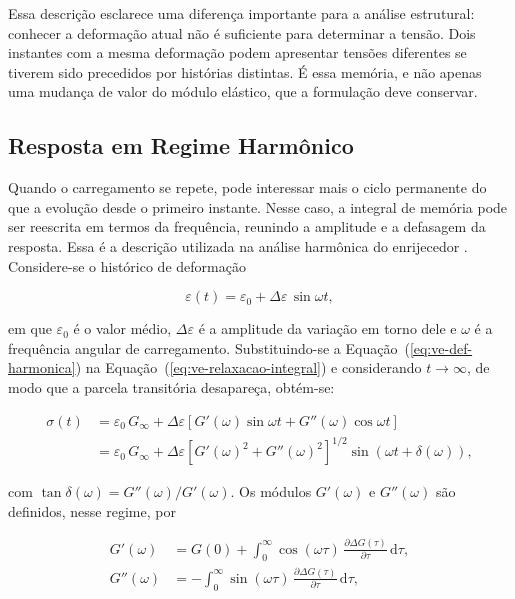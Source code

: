 \documentclass[arial,centeredequations,english,brazilian,oneside,section=TITLE]{ifes8}
\begin{document}
Essa descrição esclarece uma diferença importante para a análise estrutural:
conhecer a deformação atual não é suficiente para determinar a tensão. Dois
instantes com a mesma deformação podem apresentar tensões diferentes se tiverem
sido precedidos por histórias distintas. É essa memória, e não apenas uma
mudança de valor do módulo elástico, que a formulação deve conservar.

\subsection{Resposta em Regime Harmônico}
\label{sub:regime-harmonico}

Quando o carregamento se repete, pode interessar mais o ciclo permanente do que
a evolução desde o primeiro instante. Nesse caso, a integral de memória pode ser
reescrita em termos da frequência, reunindo a amplitude e a defasagem da resposta.
Essa é a descrição utilizada na análise harmônica do enrijecedor
\cite{Caire2011}. Considere-se o histórico de deformação

\begin{equation}
  \label{eq:ve-def-harmonica}
  \varepsilon(t) = \varepsilon_0 + \Delta\varepsilon\,\sin\omega t,
\end{equation}

em que $\varepsilon_0$ é o valor médio, $\Delta\varepsilon$ é a amplitude da variação em
torno dele e $\omega$ é a frequência angular de carregamento.
Substituindo-se a Equação~(\ref{eq:ve-def-harmonica}) na Equação~(\ref{eq:ve-relaxacao-integral})
e considerando $t \to \infty$, de modo que a parcela transitória desapareça, obtém-se:

\begin{align}
  \sigma(t) &= \varepsilon_0\,G_{\infty}
  + \Delta\varepsilon\left[G'(\omega)\sin\omega t + G''(\omega)\cos\omega t\right]
  \nonumber\\
  &= \varepsilon_0\,G_{\infty}
  + \Delta\varepsilon\left[G'(\omega)^2 + G''(\omega)^2\right]^{1/2}
  \sin\left(\omega t + \delta(\omega)\right),
  \label{eq:ve-tensao-harmonica}
\end{align}

com $\tan\delta(\omega) = G''(\omega)/G'(\omega)$. Os módulos $G'(\omega)$ e $G''(\omega)$ são
definidos, nesse regime, por

\begin{align}
  G'(\omega) &= G(0) + \int_0^{\infty} \cos(\omega\tau)\,
  \frac{\partial \Delta G(\tau)}{\partial \tau}\,\mathrm{d}\tau,
  \label{eq:ve-G-linhas}\\
  G''(\omega) &= -\int_0^{\infty} \sin(\omega\tau)\,
  \frac{\partial \Delta G(\tau)}{\partial \tau}\,\mathrm{d}\tau,
\end{align}
\end{document}
